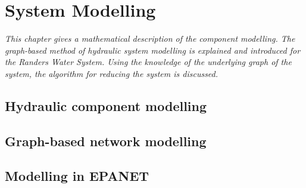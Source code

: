 \chapter{System Modelling}
\label{system_modelling}

\emph{This chapter gives a mathematical description of the component modelling. The graph-based method of hydraulic system modelling is explained and introduced for the Randers Water System. Using the knowledge of the underlying graph of the system, the algorithm for reducing the system is discussed.}

\section{Hydraulic component modelling}
\label{hydraulic_component_modelling}

\section{Graph-based network modelling}
\label{graph_based_network_modelling}

\section{Modelling in EPANET}
\label{modelling_in_epanet}